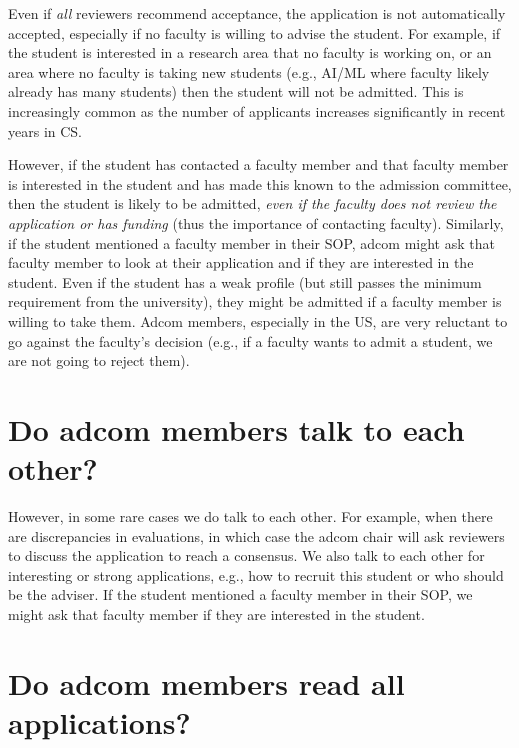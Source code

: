 \documentclass[oneside,11pt,dvipsnames]{book}
\def\sectioninfo#1{%
  \addcontentsline{toc}{sectioninfo}{%
    \noexpand\numberline{}\color{black}{#1}}%
}
\begin{document}
Even if \emph{all} reviewers recommend acceptance, the application is not automatically accepted, especially if no faculty is willing to advise the student. For example, if the student is interested in a research area that no faculty is working on, or an area where no faculty is taking new students (e.g., AI/ML where faculty likely already has many students) then the student will not be admitted.  This is increasingly common as the number of applicants increases significantly in recent years in CS.

However, if the student has contacted a faculty member and that faculty member is interested in the student and has made this known to the admission committee, then the student is likely to be admitted, \emph{even if the faculty does not review the application or has funding} (thus the importance of contacting faculty). 
Similarly, if the student mentioned a faculty member in their SOP, adcom might ask that faculty member to look at their application and if they are interested in the student.  Even if the student has a weak profile (but still passes the minimum requirement from the university), they might be admitted if a faculty member is willing to take them. Adcom members, especially in the US, are very reluctant to go against the faculty's decision (e.g., if a faculty wants to admit a student, we are not going to reject them).


\section{Do adcom members talk to each other?}\label{sec:adcom-discuss}
\sectioninfo{Sometimes adcom members discuss applicants, but in most cases they make independent decisions.}

However, in some rare cases we do talk to each other.  For example, when there are discrepancies in evaluations, in which case the adcom chair will ask reviewers to discuss the application to reach a consensus.  We also talk to each other for interesting or strong applications, e.g., how to recruit this student or who should be the adviser. 
If the student mentioned a faculty member in their SOP, we might ask that faculty member if they are interested in the student. 



\section{Do adcom members read all applications?}\label{sec:read-all}
\sectioninfo{Adcom members only review applications assigned to them (typically matching their expertise) and rarely get involved in other applications}
\end{document}
